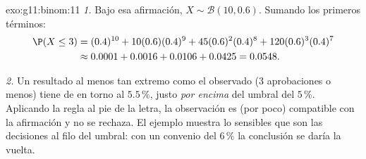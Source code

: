 \begin{solution}{exo:g11:binom:11}
\emph{1.} Bajo esa afirmación, $X \sim \mathcal B(10, 0.6)$. Sumando los
primeros términos:
\begin{align*}
\P(X \leq 3)
&= (0.4)^{10} + 10(0.6)(0.4)^9 + 45(0.6)^2(0.4)^8
+ 120(0.6)^3(0.4)^7\\
&\approx 0.0001 + 0.0016 + 0.0106 + 0.0425 = 0.0548 .
\end{align*}

\emph{2.} Un resultado al menos tan extremo como el observado ($3$
aprobaciones o menos) tiene  de en torno al $5.5\,\%$, justo
\emph{por encima} del umbral del $5\,\%$. Aplicando la regla al pie de la
letra, la observación es (por poco) compatible con la afirmación y no se
rechaza. El ejemplo muestra lo sensibles que son las decisiones al filo
del umbral: con un convenio del $6\,\%$ la conclusión se daría la vuelta.
\end{solution}

